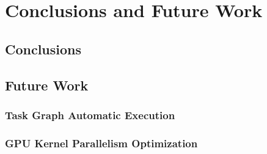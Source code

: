 \chapter{Conclusions and Future Work}

\section{Conclusions}

\section{Future Work}
\subsection{Task Graph Automatic Execution}
\subsection{GPU Kernel Parallelism Optimization}


